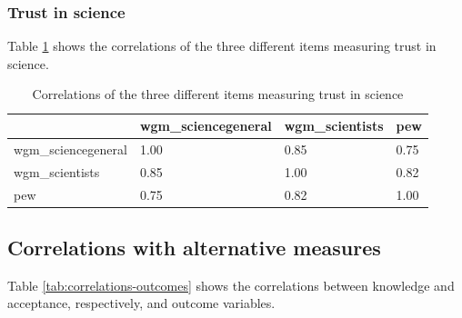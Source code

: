 \documentclass[
  doc,floatsintext]{apa6}
\begin{document}
\hypertarget{trust-in-science-2}{%
\subsubsection{Trust in science}\label{trust-in-science-2}}

Table \ref{tab:correlation-trust} shows the correlations of the three different items measuring trust in science.

\begin{table}[h]

\begin{center}
\begin{threeparttable}

\caption{\label{tab:correlation-trust}Correlations of the three different items measuring trust in science}

\begin{tabular}{llll}
\toprule
 & \multicolumn{1}{c}{wgm\_sciencegeneral} & \multicolumn{1}{c}{wgm\_scientists} & \multicolumn{1}{c}{pew}\\
\midrule
wgm\_sciencegeneral & 1.00 & 0.85 & 0.75\\
wgm\_scientists & 0.85 & 1.00 & 0.82\\
pew & 0.75 & 0.82 & 1.00\\
\bottomrule
\end{tabular}

\end{threeparttable}
\end{center}

\end{table}

\hypertarget{correlations-with-alternative-measures}{%
\subsection{Correlations with alternative measures}\label{correlations-with-alternative-measures}}

Table \ref{tab:correlations-outcomes} shows the correlations between knowledge and acceptance, respectively, and outcome variables.
\end{document}
